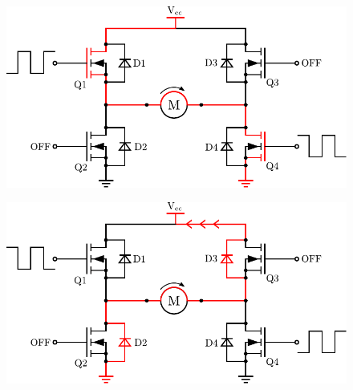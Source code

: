   \begin{minipage}{\linewidth}
  	\begin{minipage}{0.45\linewidth}
  		\begin{figure}[H]
  			\includegraphics[scale=.6]{figures/HbridgeClockwiseCoastON.pdf}
  			\centering
  			\vspace{-.4cm}
  			\captionsetup{justification=centering}
  			\label{HbridgeClockwiseCoastON}
  		\end{figure}
  	\end{minipage}
  	\hspace{0.03\linewidth}
  	\begin{minipage}{0.45\linewidth}
  		\begin{figure}[H]
  			\includegraphics[scale=.6]{figures/HbridgeClockwiseCoastRegen.pdf}
  			\centering
  			\vspace{-.4cm}
  			\captionsetup{justification=centering}
  			\label{HbridgeClokwiseCoastRegen}
  		\end{figure}
  	\end{minipage}
  \end{minipage}

